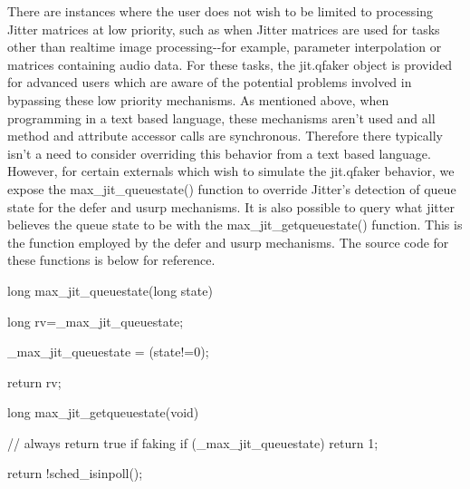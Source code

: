 There are instances where the user does not wish to be limited to processing Jitter matrices at low priority, such as when Jitter matrices are used for tasks other than realtime image processing-\/-\/for example, parameter interpolation or matrices containing audio data. For these tasks, the jit.qfaker object is provided for advanced users which are aware of the potential problems involved in bypassing these low priority mechanisms. As mentioned above, when programming in a text based language, these mechanisms aren't used and all method and attribute accessor calls are synchronous. Therefore there typically isn't a need to consider overriding this behavior from a text based language. However, for certain externals which wish to simulate the jit.qfaker behavior, we expose the max\_\-jit\_\-queuestate() function to override Jitter's detection of queue state for the defer and usurp mechanisms. It is also possible to query what jitter believes the queue state to be with the max\_\-jit\_\-getqueuestate() function. This is the function employed by the defer and usurp mechanisms. The source code for these functions is below for reference.


\begin{DoxyCode}
long max_jit_queuestate(long state) 
{
   long rv=_max_jit_queuestate;
   
   _max_jit_queuestate = (state!=0);
   
   return rv;
}

long max_jit_getqueuestate(void)
{
   // always return true if faking
   if (_max_jit_queuestate) return 1;
   
   return !sched_isinpoll();         
}
\end{DoxyCode}
 